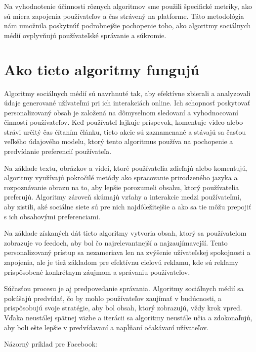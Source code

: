\documentclass[12pt,twoside,slovak,a4paper]{article}
\begin{document}
Na vyhodnotenie účinnosti rôznych algoritmov sme použili špecifické metriky, ako sú miera zapojenia používateľov a čas strávený na platforme. Táto metodológia nám umožnila poskytnúť podrobnejšie pochopenie toho, ako algoritmy sociálnych médií ovplyvňujú používateľské správanie a súkromie.


\section{Ako tieto algoritmy fungujú}
Algoritmy sociálnych médií sú navrhnuté tak, aby efektívne zbierali a analyzovali údaje generované užívateľmi pri ich interakciách online. Ich schopnosť poskytovať personalizovaný obsah je založená na dômyselnom sledovaní a vyhodnocovaní činností používateľov. Keď používateľ lajkuje príspevok, komentuje video alebo strávi určitý čas čítaním článku, tieto akcie sú zaznamenané a stávajú sa časťou veľkého údajového modelu, ktorý tento algoritmus používa na pochopenie a predvídanie preferencií používateľa.\cite{10057722}

Na základe textu, obrázkov a videí, ktoré používatelia zdieľajú alebo komentujú, algoritmy využívajú pokročilé metódy ako spracovanie prirodzeného jazyka a rozpoznávanie obrazu na to, aby lepšie porozumeli obsahu, ktorý používatelia preferujú. Algoritmy zároveň skúmajú vzťahy a interakcie medzi používateľmi, aby zistili, aké sociálne siete sú pre nich najdôležitejšie a ako sa tie môžu prepojiť s ich obsahovými preferenciami.

Na základe získaných dát tieto algoritmy vytvoria obsah, ktorý sa používateľom zobrazuje vo feedoch, aby bol čo najrelevantnejší a najzaujímavejší. Tento personalizovaný prístup sa nezameriava len na zvýšenie užívateľskej spokojnosti a zapojenia, ale je tiež základom pre efektívnu cieľovú reklamu, kde sú reklamy prispôsobené konkrétnym záujmom a správaniu používateľov.

Súčasťou procesu je aj predpovedanie správania. Algoritmy sociálnych médií sa pokúšajú predvídať, čo by mohlo používateľov zaujímať v budúcnosti, a prispôsobujú svoje stratégie, aby bol obsah, ktorý zobrazujú, vždy krok vpred. Vďaka neustálej spätnej väzbe a iterácii sa algoritmy neustále učia a zdokonaľujú, aby boli ešte lepšie v predvídavaní a napĺňaní očakávaní užívateľov.


Názorný príklad pre Facebook:
\end{document}
